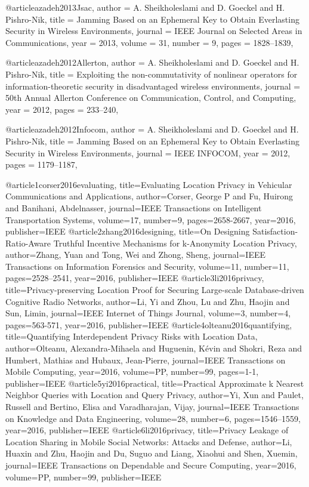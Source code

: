 {{{{{{@article{azadeh2013Jsac,
	author = {A. Sheikholeslami and D. Goeckel and H. Pishro-Nik},
	title = {Jamming Based on an Ephemeral Key to Obtain Everlasting Security in Wireless Environments},
	journal = {IEEE Journal on Selected Areas in Communications},
	year = {2013},
	volume = {31},
	number = {9},
	pages = {1828--1839},
}


@article{azadeh2012Allerton,
	author = {A. Sheikholeslami and D. Goeckel and H. Pishro-Nik},
	title = {Exploiting the non-commutativity of nonlinear operators for information-theoretic security in disadvantaged wireless environments},
	journal = {50th Annual Allerton Conference on Communication, Control, and Computing},
	year = {2012},
	pages = {233--240},
}


@article{azadeh2012Infocom,
	author = {A. Sheikholeslami and D. Goeckel and H. Pishro-Nik},
	title = {Jamming Based on an Ephemeral Key to Obtain Everlasting Security in Wireless Environments},
	journal = {IEEE INFOCOM},
	year = {2012},
	pages = {1179--1187},
}

@article{1corser2016evaluating,
	title={Evaluating Location Privacy in Vehicular Communications and Applications},
	author={Corser, George P and Fu, Huirong and Banihani, Abdelnasser},
	journal={IEEE Transactions on Intelligent Transportation Systems},
	volume={17},
	number={9},
	pages={2658-2667},
	year={2016},
	publisher={IEEE}
}
@article{2zhang2016designing,
	title={On Designing Satisfaction-Ratio-Aware Truthful Incentive Mechanisms for k-Anonymity Location Privacy},
	author={Zhang, Yuan and Tong, Wei and Zhong, Sheng},
	journal={IEEE Transactions on Information Forensics and Security},
	volume={11},
	number={11},
	pages={2528--2541},
	year={2016},
	publisher={IEEE}
}
@article{3li2016privacy,
	title={Privacy-preserving Location Proof for Securing Large-scale Database-driven Cognitive Radio Networks},
	author={Li, Yi and Zhou, Lu and Zhu, Haojin and Sun, Limin},
	journal={IEEE Internet of Things Journal},
	volume={3},
	number={4},
	pages={563-571},
	year={2016},
	publisher={IEEE}
}
@article{4olteanu2016quantifying,
	title={Quantifying Interdependent Privacy Risks with Location Data},
	author={Olteanu, Alexandra-Mihaela and Huguenin, K{\'e}vin and Shokri, Reza and Humbert, Mathias and Hubaux, Jean-Pierre},
	journal={IEEE Transactions on Mobile Computing},
	year={2016},
	volume={PP},
	number={99},
	pages={1-1},
	publisher={IEEE}
}
@article{5yi2016practical,
	title={Practical Approximate k Nearest Neighbor Queries with Location and Query Privacy},
	author={Yi, Xun and Paulet, Russell and Bertino, Elisa and Varadharajan, Vijay},
	journal={IEEE Transactions on Knowledge and Data Engineering},
	volume={28},
	number={6},
	pages={1546--1559},
	year={2016},
	publisher={IEEE}
}
@article{6li2016privacy,
	title={Privacy Leakage of Location Sharing in Mobile Social Networks: Attacks and Defense},
	author={Li, Huaxin and Zhu, Haojin and Du, Suguo and Liang, Xiaohui and Shen, Xuemin},
	journal={IEEE Transactions on Dependable and Secure Computing},
	year={2016},
	volume={PP},
	number={99},
	publisher={IEEE}
}

}}}}}}
